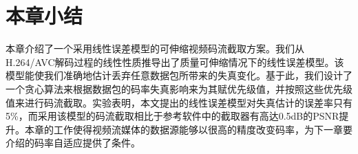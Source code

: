 \section{本章小结}

本章介绍了一个采用线性误差模型的可伸缩视频码流截取方案。我们从H.264/AVC解码过程的线性性质推导出了质量可伸缩情况下的线性误差模型。该模型能使我们准确地估计丢弃任意数据包所带来的失真变化。基于此，我们设计了一个贪心算法来根据数据包的码率失真影响来为其赋优先级值，并按照这些优先级值来进行码流截取。实验表明，本文提出的线性误差模型对失真估计的误差率只有5\%，而采用该模型的码流截取相比于参考软件中的截取器有高达0.5dB的PSNR提升。本章的工作使得视频流媒体的数据源能够以很高的精度改变码率，为下一章要介绍的码率自适应提供了条件。